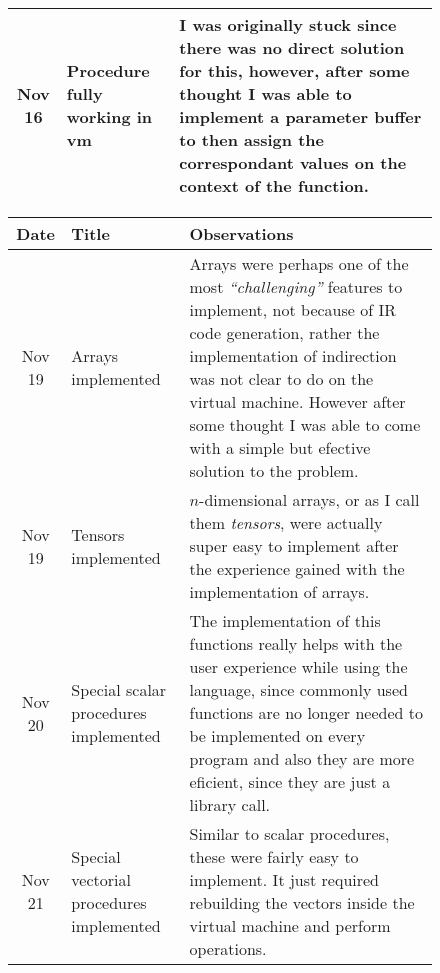 \begin{figure}[H]
\begin{tabular}{cp{1.25in}p{2.5in}}
        \midrule
        Nov 16 & Procedure fully working in vm &
        I was originally stuck since there was no direct solution for this,
        however, after some thought I was able to implement a parameter buffer
        to then assign the correspondant values on the context of the function.\\

        \bottomrule
    \end{tabular}
\end{figure}

\begin{figure}[H]
    \centering
    \begin{tabular}{cp{1.25in}p{2.5in}}
        \toprule
        \textbf{Date} & \textbf{Title} & \textbf{Observations}\\
        \midrule
        Nov 19 & Arrays implemented &
        Arrays were perhaps one of the most \emph{``challenging''} features to
        implement, not because of IR code generation, rather the implementation
        of indirection was not clear to do on the virtual machine. However
        after some thought I was able to come with a simple but efective
        solution to the problem.\\ 

        \midrule
        Nov 19 & Tensors \newline implemented &
        $n$-dimensional arrays, or as I call them \emph{tensors}, were actually
        super easy to implement after the experience gained with the
        implementation of arrays.\\

        \midrule
        Nov 20 & Special scalar \newline procedures \newline implemented &
        The implementation of this functions really helps with the user
        experience while using the language, since commonly used functions are
        no longer needed to be implemented on every program and also they are
        more eficient, since they are just a \newline library call.\\

        \midrule
        Nov 21 & Special vectorial \newline procedures \newline implemented &
        Similar to scalar procedures, these were fairly easy to implement. It
        just required rebuilding the vectors inside the virtual machine and
        perform operations.\\


\end{tabular}
\end{figure}
